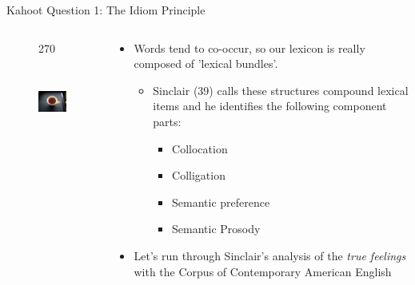 \documentclass{beamer}
\begin{document}
\begin{frame}{Kahoot Question 1: The Idiom Principle}
	\begin{columns}
    	\begin{column}{6cm}
        	\begin{figure}
            	\begin{turn}{270}
                \includegraphics[height=3cm, width=3cm]{Black-tea.jpg}
                \end{turn}
            \end{figure}
        \end{column}
        \begin{column}{6cm}
        \pause
        \begin{itemize}
        	\item Words tend to co-occur, so our lexicon is really composed of 'lexical bundles'.
            \begin{itemize}
            	\pause
                \item Sinclair (39) calls these structures compound lexical items and he identifies the following component parts:
            	\begin{itemize}
                	\pause
                    \item Collocation
                    \pause
                	\item Colligation
                    \pause
                    \item Semantic preference
                    \pause
                    \item Semantic Prosody
           		\end{itemize}
            \end{itemize}
        \pause
        \item Let's run through Sinclair's analysis of the \textit{true feelings} with the Corpus of Contemporary American English
        \end{itemize}
        \end{column}
    \end{columns}
\end{frame}
\end{document}

